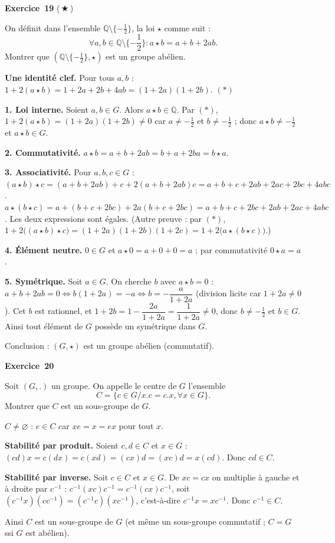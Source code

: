 \documentclass[11pt,a4paper]{article}
\newcommand{\Q}{\mathbb{Q}}\newcommand{\C}{\mathbb{C}}
\begin{document}
	\medskip\noindent\textbf{\Large\color{bleu}Exercice~19} \textnormal{(\,$\bigstar$\,)}\nopagebreak
	\begin{enonce}
		On définit dans l'ensemble $\mathbb{Q} \setminus \{-\frac{1}{2}\}$, la loi $\star$ comme suit :
		\[
		\forall a,b \in \mathbb{Q} \setminus \{-\frac{1}{2}\} : a \star b = a + b + 2ab.
		\]
		Montrer que $(\mathbb{Q} \setminus \{-\frac{1}{2}\}, \star)$ est un groupe abélien.
	\end{enonce}
	\begin{corrige}
		\textbf{Une identité clef.} Pour tous $a,b$ : $1+2(a\star b)=1+2a+2b+4ab=(1+2a)(1+2b)$. $(\ast)$
		
		\textbf{1. Loi interne.} Soient $a,b\in G$. Alors $a\star b\in\Q$. Par $(\ast)$, $1+2(a\star b)=(1+2a)(1+2b)\neq0$ car $a\neq-\frac12$ et $b\neq-\frac12$ ; donc $a\star b\neq-\frac12$ et $a\star b\in G$.
		
		\textbf{2. Commutativité.} $a\star b=a+b+2ab=b+a+2ba=b\star a$.
		
		\textbf{3. Associativité.} Pour $a,b,c\in G$ :
		$(a\star b)\star c=(a+b+2ab)+c+2(a+b+2ab)c=a+b+c+2ab+2ac+2bc+4abc$.
		$a\star(b\star c)=a+(b+c+2bc)+2a(b+c+2bc)=a+b+c+2bc+2ab+2ac+4abc$.
		Les deux expressions sont égales. (Autre preuve : par $(\ast)$, $1+2\bigl((a\star b)\star c\bigr)=(1+2a)(1+2b)(1+2c)=1+2\bigl(a\star(b\star c)\bigr)$.)
		
		\textbf{4. Élément neutre.} $0\in G$ et $a\star0=a+0+0=a$ ; par commutativité $0\star a=a$.
		
		\textbf{5. Symétrique.} Soit $a\in G$. On cherche $b$ avec $a\star b=0$ : $a+b+2ab=0\iff b(1+2a)=-a\iff b=-\dfrac a{1+2a}$ (division licite car $1+2a\neq0$). Cet $b$ est rationnel, et $1+2b=1-\dfrac{2a}{1+2a}=\dfrac1{1+2a}\neq0$, donc $b\neq-\frac12$ et $b\in G$. Ainsi tout élément de $G$ possède un symétrique dans $G$.
		
		Conclusion : $(G,\star)$ est un groupe abélien (commutatif).
	\end{corrige}
	
	\medskip\noindent\textbf{\Large\color{bleu}Exercice~20}\nopagebreak
	\begin{enonce}
		Soit $(G, .)$ un groupe. On appelle le centre de $G$ l'ensemble
		\[
		C = \{c \in G / x.c = c.x, \forall x \in G\}.
		\]
		Montrer que $C$ est un sous-groupe de $G$.
	\end{enonce}
	\begin{corrige}
		\textbf{$C\neq\varnothing$} : $e\in C$ car $xe=x=ex$ pour tout $x$.
		
		\textbf{Stabilité par produit.} Soient $c,d\in C$ et $x\in G$ : $(cd)x=c(dx)=c(xd)=(cx)d=(xc)d=x(cd)$. Donc $cd\in C$.
		
		\textbf{Stabilité par inverse.} Soit $c\in C$ et $x\in G$. De $xc=cx$ on multiplie à gauche et à droite par $c^{-1}$ : $c^{-1}(xc)c^{-1}=c^{-1}(cx)c^{-1}$, soit $(c^{-1}x)(cc^{-1})=(c^{-1}c)(xc^{-1})$, c'est-à-dire $c^{-1}x=xc^{-1}$. Donc $c^{-1}\in C$.
		
		Ainsi $C$ est un sous-groupe de $G$ (et même un sous-groupe commutatif ; $C=G$ ssi $G$ est abélien).
	\end{corrige}
	
\end{document}
